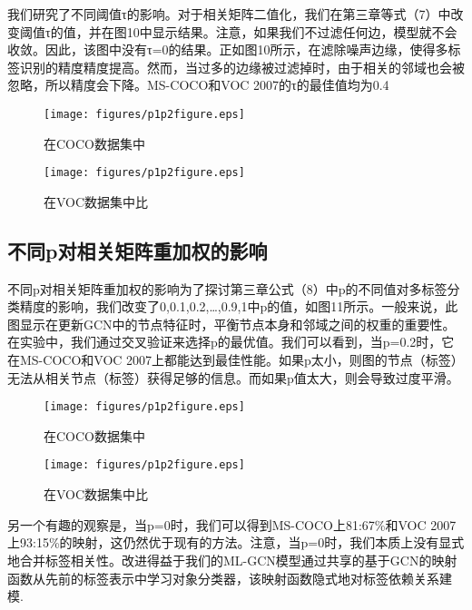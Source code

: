 我们研究了不同阈值τ的影响。对于相关矩阵二值化，我们在第三章等式（7）中改变阈值τ的值，并在图10中显示结果。注意，如果我们不过滤任何边，模型就不会收敛。因此，该图中没有τ=0的结果。正如图10所示，在滤除噪声边缘，使得多标签识别的精度精度提高。然而，当过多的边缘被过滤掉时，由于相关的邻域也会被忽略，所以精度会下降。MS-COCO和VOC 2007的τ的最佳值均为0.4

\begin{figure}[htbp!]
	\centering
	\texttt{[image: figures/p1p2figure.eps]}
	\caption{在COCO数据集中 }\label{fig:simuP1P2Result}
	\vspace{-1em}
\end{figure}

\begin{figure}[htbp!]
	\centering
	\texttt{[image: figures/p1p2figure.eps]}
	\caption{在VOC数据集中比}\label{fig:simuP1P2Result}
	\vspace{-1em}
\end{figure}

\subsection{不同p对相关矩阵重加权的影响}
不同p对相关矩阵重加权的影响为了探讨第三章公式（8）中p的不同值对多标签分类精度的影响，我们改变了{0,0.1,0.2,…,0.9,1}中p的值，如图11所示。一般来说，此图显示在更新GCN中的节点特征时，平衡节点本身和邻域之间的权重的重要性。在实验中，我们通过交叉验证来选择p的最优值。我们可以看到，当p=0.2时，它在MS-COCO和VOC 2007上都能达到最佳性能。如果p太小，则图的节点（标签）无法从相关节点（标签）获得足够的信息。而如果p值太大，则会导致过度平滑。

\begin{figure}[htbp!]
	\centering
	\texttt{[image: figures/p1p2figure.eps]}
	\caption{在COCO数据集中 }\label{fig:simuP1P2Result}
	\vspace{-1em}
\end{figure}

\begin{figure}[htbp!]
	\centering
	\texttt{[image: figures/p1p2figure.eps]}
	\caption{在VOC数据集中比}\label{fig:simuP1P2Result}
	\vspace{-1em}
\end{figure}

另一个有趣的观察是，当p=0时，我们可以得到MS-COCO上81:67\%和VOC 2007上93:15\%的映射，这仍然优于现有的方法。注意，当p=0时，我们本质上没有显式地合并标签相关性。改进得益于我们的ML-GCN模型通过共享的基于GCN的映射函数从先前的标签表示中学习对象分类器，该映射函数隐式地对标签依赖关系建模.

